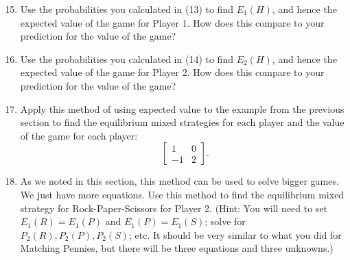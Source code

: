 \begin{enumerate}
\setcounter{enumi}{14}

 
\item Use the probabilities you calculated  in (13) to find $E_1(H)$, and hence the expected value of the game for Player 1. How does this compare to your prediction for the value of the game?
\vspace{.1 in}

\item Use the probabilities you calculated  in (14) to find $E_2(H)$, and hence the expected value of the game for Player 2. How does this compare to your prediction for the value of the game?
\vspace{.1 in}

\item Apply this method of using expected value to the example from the previous section to find the equilibrium mixed strategies  for each player and the value of the game for each player:
\[\left[\begin{matrix}
1&0\\
-1&2
\end{matrix}\right].
\]
 
 \item As we noted in this section, this method can be used to solve bigger games. We just have more equations. Use this method to find the equilibrium mixed strategy for Rock-Paper-Scissors for Player 2. (Hint: You will need to set $E_1(R)=E_1(P)$ and $E_1(P)=E_1(S)$; solve for $P_2(R), P_2(P), P_2(S)$; etc. It should be very similar to what you did for Matching Pennies, but there will be three equations and three unknowns.)

\end{enumerate}





 